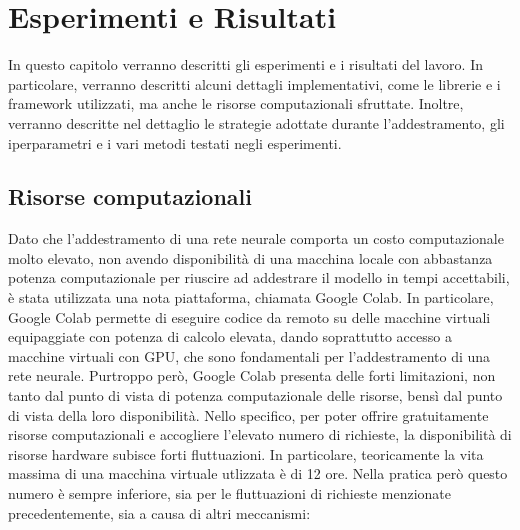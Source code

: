 \chapter{Esperimenti e Risultati}
\label{chap_exp}
In questo capitolo verranno descritti gli esperimenti e i risultati del lavoro. In particolare, verranno descritti alcuni dettagli implementativi, come le librerie e i framework utilizzati, ma anche le risorse computazionali sfruttate. Inoltre, verranno descritte nel dettaglio le strategie adottate durante l'addestramento, gli iperparametri e i vari metodi testati negli esperimenti.





\section{Risorse computazionali}
\label{risorse_comp}
Dato che l'addestramento di una rete neurale comporta un costo computazionale molto elevato, non avendo disponibilità di una macchina locale con abbastanza potenza computazionale per riuscire ad addestrare il modello in tempi accettabili, è stata utilizzata una nota piattaforma, chiamata Google Colab. In particolare, Google Colab permette di eseguire codice da remoto su delle macchine virtuali equipaggiate con potenza di calcolo elevata, dando soprattutto accesso a macchine virtuali con GPU, che sono fondamentali per l'addestramento di una rete neurale. Purtroppo però, Google Colab presenta delle forti limitazioni, non tanto dal punto di vista di potenza computazionale delle risorse, bensì dal punto di vista della loro disponibilità. Nello specifico, per poter offrire gratuitamente risorse computazionali e accogliere l'elevato numero di richieste, la disponibilità di risorse hardware subisce forti fluttuazioni.
In particolare, teoricamente la vita massima di una macchina virtuale utlizzata è di 12 ore. Nella pratica però questo numero è sempre inferiore, sia per le fluttuazioni di richieste menzionate precedentemente, sia a causa di altri meccanismi:

